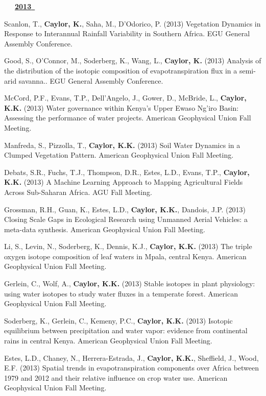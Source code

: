 \begin{etaremune}
\vspace{0.1in}
\mbox{\ \ \ \underline{\textbf{2013 }}}
\vspace{0.1in}

\item Scanlon, T., \textbf{ Caylor, K.}, Saha, M., D'Odorico, P. (2013) Vegetation Dynamics in Response to Interannual Rainfall Variability in Southern Africa. EGU General Assembly Conference.
\item Good, S., O'Connor, M., Soderberg, K., Wang, L., \textbf{ Caylor, K.} (2013) Analysis of the distribution of the isotopic composition of evapotranspiration flux in a semi-arid savanna.. EGU General Assembly Conference.
\item McCord, P.F., Evans, T.P., Dell'Angelo, J., Gower, D., McBride, L., \textbf{ Caylor, K.K.} (2013) Water governance within Kenya's Upper Ewaso Ng'iro Basin: Assessing the performance of water projects. American Geophysical Union Fall Meeting.
\item Manfreda, S., Pizzolla, T., \textbf{ Caylor, K.K.} (2013) Soil Water Dynamics in a Clumped Vegetation Pattern. American Geophysical Union Fall Meeting.
\item Debats, S.R., Fuchs, T.J., Thompson, D.R., Estes, L.D., Evans, T.P., \textbf{ Caylor, K.K.} (2013) A Machine Learning Approach to Mapping Agricultural Fields Across Sub-Saharan Africa. AGU Fall Meeting.
\item Grossman, R.H., Guan, K., Estes, L.D., \textbf{ Caylor, K.K.}, Dandois, J.P. (2013) Closing Scale Gaps in Ecological Research using Unmanned Aerial Vehicles: a meta-data synthesis. American Geophysical Union Fall Meeting.
\item Li, S., Levin, N., Soderberg, K., Dennis, K.J., \textbf{ Caylor, K.K.} (2013) The triple oxygen isotope composition of leaf waters in Mpala, central Kenya. American Geophysical Union Fall Meeting.
\item Gerlein, C., Wolf, A., \textbf{ Caylor, K.K.} (2013) Stable isotopes in plant physiology: using water isotopes to study water fluxes in a temperate forest. American Geophysical Union Fall Meeting.
\item Soderberg, K., Gerlein, C., Kemeny, P.C., \textbf{ Caylor, K.K.} (2013) Isotopic equilibrium between precipitation and water vapor: evidence from continental rains in central Kenya. American Geophysical Union Fall Meeting.
\item Estes, L.D., Chaney, N., Herrera-Estrada, J., \textbf{ Caylor, K.K.}, Sheffield, J., Wood, E.F. (2013) Spatial trends in evapotranspiration components over Africa between 1979 and 2012 and their relative influence on crop water use. American Geophysical Union Fall Meeting.

\end{etaremune}
